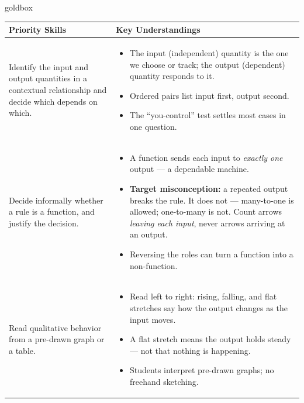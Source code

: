 \documentclass[10pt]{article}
\begin{document}
\renewcommand{\arraystretch}{1.6}
\begin{skillbox}{goldbox}
\begin{tabularx}{\linewidth}{@{}X X@{}}
\textbf{Priority Skills} &
\textbf{Key Understandings} \\
\midrule
Identify the input and output quantities in a contextual relationship
and decide which depends on which. &
\begin{itemize}[leftmargin=1.2em,itemsep=2pt,topsep=0pt]
  \item The input (independent) quantity is the one we choose or track;
        the output (dependent) quantity responds to it.
  \item Ordered pairs list input first, output second.
  \item The ``you-control'' test settles most cases in one question.
\end{itemize} \\
Decide informally whether a rule is a function, and justify the decision. &
\begin{itemize}[leftmargin=1.2em,itemsep=2pt,topsep=0pt]
  \item A function sends each input to \textit{exactly one} output ---
        a dependable machine.
  \item \textbf{Target misconception:} a repeated output breaks the rule. It
        does not --- many-to-one is allowed; one-to-many is not. Count arrows
        \textit{leaving each input}, never arrows arriving at an output.
  \item Reversing the roles can turn a function into a non-function.
\end{itemize} \\
Read qualitative behavior from a pre-drawn graph or a table. &
\begin{itemize}[leftmargin=1.2em,itemsep=2pt,topsep=0pt]
  \item Read left to right: rising, falling, and flat stretches say how the
        output changes as the input moves.
  \item A flat stretch means the output holds steady --- not that nothing is
        happening.
  \item Students interpret pre-drawn graphs; no freehand sketching.
\end{itemize} \\
\end{tabularx}
\end{skillbox}
\end{document}
